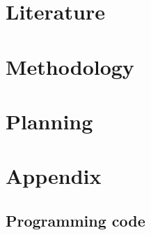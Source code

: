 \documentclass[a4paper,11pt]{article}
\begin{document}
\section{Literature}
	
\section{Methodology}
    
\section{Planning}


\newpage
 
 

\newpage
\appendix
\section{Appendix}
\subsection{Programming code}
\end{document}
